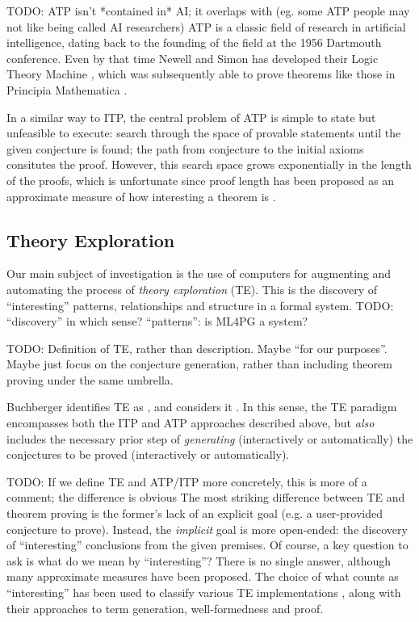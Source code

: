 \documentclass[]{article}
\begin{document}
TODO: ATP isn't *contained in* AI; it overlaps with (eg. some ATP people may not like being called AI researchers)
ATP is a classic field of research in artificial intelligence, dating back to the founding of the field at the 1956 Dartmouth conference. Even by that time Newell and Simon has developed their Logic Theory Machine \cite{newell1956logic}, which was subsequently able to prove theorems like those in Principia Mathematica \cite{newell1958elements}.

In a similar way to ITP, the central problem of ATP is simple to state but unfeasible to execute: search through the space of provable statements until the given conjecture is found; the path from conjecture to the initial axioms consitutes the proof. However, this search space grows exponentially in the length of the proofs, which is unfortunate since proof length has been proposed as an approximate measure of how interesting a theorem is \cite[\S~10.2.1]{colton2012automated}.

\subsection{Theory Exploration}

Our main subject of investigation is the use of computers for augmenting and automating the process of \emph{theory exploration} (TE). This is the discovery of ``interesting'' patterns, relationships and structure in a formal system. TODO: ``discovery'' in which sense? ``patterns'': is ML4PG a system?

TODO: Definition of TE, rather than description. Maybe ``for our purposes''. Maybe just focus on the conjecture generation, rather than including theorem proving under the same umbrella.

Buchberger identifies TE as  \cite{buchberger2004algorithm}, and considers it  \cite{buchberger2000theory}. In this sense, the TE paradigm encompasses both the ITP and ATP approaches described above, but \emph{also} includes the necessary prior step of \emph{generating} (interactively or automatically) the conjectures to be proved (interactively or automatically).

TODO: If we define TE and ATP/ITP more concretely, this is more of a comment; the difference is obvious
The most striking difference between TE and theorem proving is the former's lack of an explicit goal (e.g. a user-provided conjecture to prove). Instead, the \emph{implicit} goal is more open-ended: the discovery of ``interesting'' conclusions from the given premises. Of course, a key question to ask is what do we mean by ``interesting''? There is no single answer, although many approximate measures have been proposed. The choice of what counts as ``interesting'' has been used to classify various TE implementations \cite{warburtonscaling}, along with their approaches to term generation, well-formedness and proof.
\end{document}
